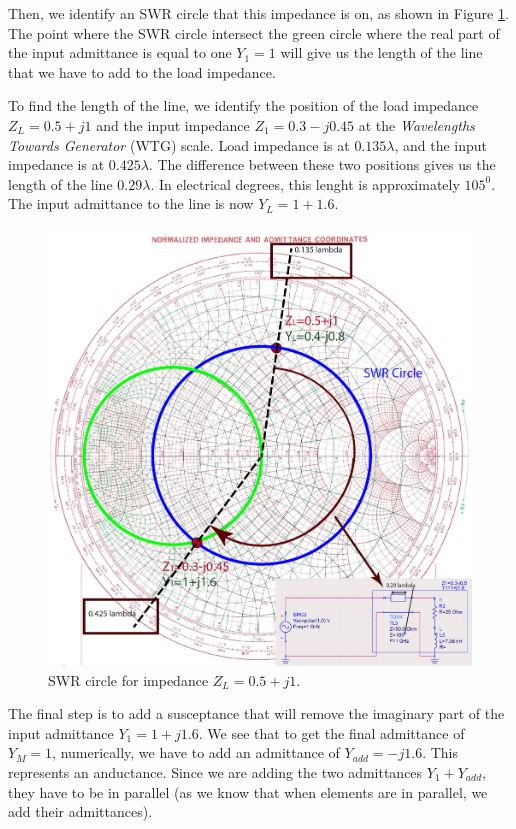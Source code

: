\documentclass{ximera}
\begin{document}
Then, we identify an SWR circle that this impedance is on, as shown in Figure \ref{fig:SWRfor25Ohm}. The point where the SWR circle intersect the green circle where the real part of the input admittance is equal to one $Y_1=1$ will give us the length of the line that we have to add to the load impedance. 

To find the length of the line, we identify the position of the load impedance $Z_L=0.5+j1$ and the input impedance $Z_1=0.3-j0.45$ at the {\it Wavelengths Towards Generator} (WTG) scale. Load impedance is at $0.135 \lambda$, and the input impedance is at $0.425 \lambda$. The difference between these two positions gives us the length of the line $0.29 \lambda$. In electrical degrees, this lenght is approximately $105^0$. The input admittance to the line is now $Y_L=1+1.6$.

\begin{figure}[htbp]
\begin{center}
\includegraphics[scale=0.4]{../jpg/Match2.jpg}
\end{center}
\caption{SWR circle for impedance $Z_L=0.5+j1$.  }
\label{fig:SWRfor25Ohm}
\end{figure}


The final step is to add a susceptance that will remove the imaginary part of the input admittance $Y_1=1+j 1.6$. We see that to get the final admittance of $Y_M=1$, numerically, we have to add an admittance of $Y_{add}=-j1.6$. This represents an anductance. Since we are adding the two admittances $Y_1+Y_{add}$, they have to be in parallel (as we know that when elements are in parallel, we add their admittances).
\end{document}
